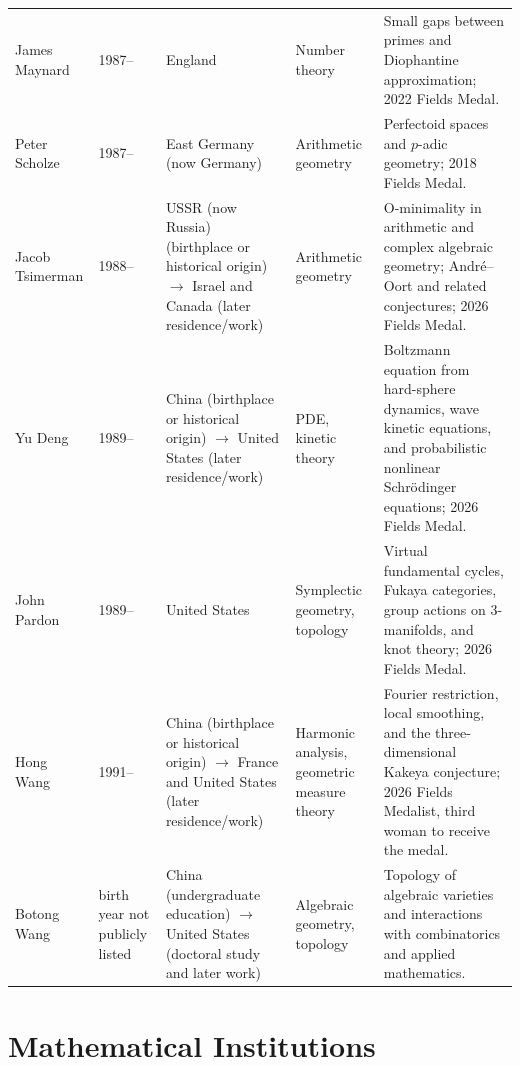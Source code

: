 {\begin{longtable}{@{}L{0.145\textwidth}L{0.09\textwidth}L{0.225\textwidth}L{0.14\textwidth}L{0.30\textwidth}@{}}
        James Maynard
        & 1987--
        & England
        & Number theory
        & Small gaps between primes and Diophantine approximation; 2022 Fields
          Medal. \\

        Peter Scholze
        & 1987--
        & East Germany (now Germany)
        & Arithmetic geometry
        & Perfectoid spaces and $p$-adic geometry; 2018 Fields Medal. \\

        Jacob Tsimerman
        & 1988--
        & USSR (now Russia) (birthplace or historical origin) \(\to\) Israel and Canada (later residence/work)
        & Arithmetic geometry
        & O-minimality in arithmetic and complex algebraic geometry;
          André--Oort and related conjectures; 2026 Fields Medal. \\

        Yu Deng
        & 1989--
        & China (birthplace or historical origin) \(\to\) United States (later residence/work)
        & PDE, kinetic theory
        & Boltzmann equation from hard-sphere dynamics, wave kinetic equations,
          and probabilistic nonlinear Schrödinger equations; 2026 Fields
          Medal. \\

        John Pardon
        & 1989--
        & United States
        & Symplectic geometry, topology
        & Virtual fundamental cycles, Fukaya categories, group actions on
          $3$-manifolds, and knot theory; 2026 Fields Medal. \\

        Hong Wang
        & 1991--
        & China (birthplace or historical origin) \(\to\) France and United States (later residence/work)
        & Harmonic analysis, geometric measure theory
        & Fourier restriction, local smoothing, and the three-dimensional
          Kakeya conjecture; 2026 Fields Medalist, third woman to receive the
          medal. \\

        Botong Wang
        & birth year not publicly listed
        & China (undergraduate education) \(\to\) United States (doctoral study and later work)
        & Algebraic geometry, topology
        & Topology of algebraic varieties and interactions with combinatorics
          and applied mathematics. \\
    \end{longtable}
    }

    \section*{Mathematical Institutions}


